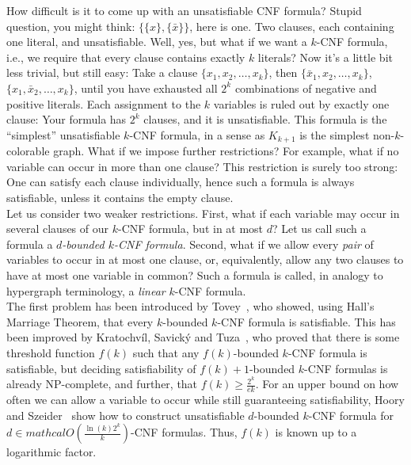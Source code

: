 \documentclass[envcountsect, envcountsame]{llncs}
\begin{document}
How difficult is it to come up with an unsatisfiable CNF formula?
Stupid question, you might think: $\{\{x\},\{\bar{x}\}\}$, here is
one. Two clauses, each containing one literal, and unsatisfiable.
Well, yes, but what if we want a $k$-CNF formula, i.e., we require
that every clause contains exactly $k$ literals? Now it's a little bit
less trivial, but still easy: Take a clause $\{x_1,x_2,\dots,x_k\}$,
then $\{\bar{x}_1,x_2,\dots,x_k\}$, $\{x_1,\bar{x}_2,\dots,x_k\}$,
until you have exhausted all $2^k$ combinations of negative and
positive literals. Each assignment to the $k$ variables is ruled out
by exactly one clause: Your formula has $2^k$ clauses, and it is
unsatisfiable. This formula is the ``simplest'' unsatisfiable $k$-CNF
formula, in a sense as $K_{k+1}$ is the simplest non-$k$-colorable
graph. What if we impose further restrictions? For example, what if no
variable can occur in more than one clause? This restriction is surely
too strong: One can satisfy each clause individually, hence such
a formula is always satisfiable, unless it contains the empty clause.\\

Let us consider two weaker restrictions. First, what if each variable
may occur in several clauses of our $k$-CNF formula, but in at most
$d$? Let us call such a formula a {\em $d$-bounded $k$-CNF formula}.
Second, what if we allow every {\em pair} of variables to occur in at
most one clause, or, equivalently, allow any two clauses to have at
most one variable in common? Such a formula is called, in analogy to
hypergraph terminology, a {\em linear} $k$-CNF formula.\\

The first problem has been introduced by Tovey~\cite{Tovey84}, who
showed, using Hall's Marriage Theorem, that every $k$-bounded $k$-CNF
formula is satisfiable. This has been improved by Kratochv\'{i}l,
Savick\'{y} and Tuza~\cite{KST93}, who proved that there is some
threshold function $f(k)$ such that any $f(k)$-bounded $k$-CNF formula
is satisfiable, but deciding satisfiability of $f(k)+1$-bounded
$k$-CNF formulas is already NP-complete, and further, that $f(k) \geq
\frac{2^k}{ek}$.  For an upper bound on how often we can allow a
variable to occur while still guaranteeing satisfiability, Hoory and
Szeider~\cite{HS06} show how to construct unsatisfiable $d$-bounded
$k$-CNF formula for $d \in
mathcal{O}\left(\frac{\ln(k)2^k}{k}\right)$-CNF formulas.
Thus, $f(k)$ is known up to a logarithmic factor.\\
\end{document}
